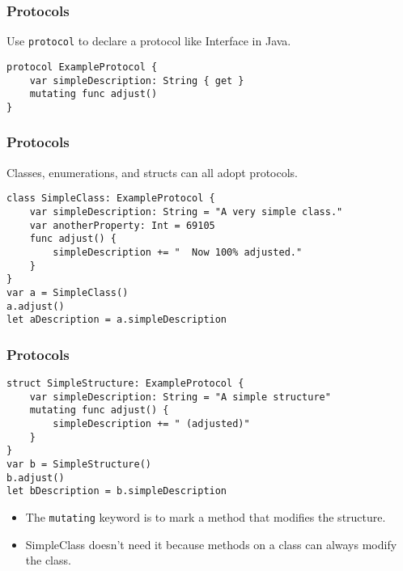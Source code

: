 \begin{frame}[fragile] \frametitle{Protocols}

Use \lstinline|protocol| to declare a protocol like Interface in Java.


\begin{lstlisting}
protocol ExampleProtocol {
    var simpleDescription: String { get }
    mutating func adjust()
}
\end{lstlisting}
\end{frame}

\begin{frame}[fragile] \frametitle{Protocols}

Classes, enumerations, and structs can all adopt protocols.

\begin{lstlisting}
class SimpleClass: ExampleProtocol {
    var simpleDescription: String = "A very simple class."
    var anotherProperty: Int = 69105
    func adjust() {
        simpleDescription += "  Now 100% adjusted."
    }
}
var a = SimpleClass()
a.adjust()
let aDescription = a.simpleDescription
\end{lstlisting}
\end{frame}

\begin{frame}[fragile] \frametitle{Protocols}

\begin{lstlisting}
struct SimpleStructure: ExampleProtocol {
    var simpleDescription: String = "A simple structure"
    mutating func adjust() {
        simpleDescription += " (adjusted)"
    }
}
var b = SimpleStructure()
b.adjust()
let bDescription = b.simpleDescription
\end{lstlisting}

\begin{itemize}
\item The \lstinline|mutating| keyword is to mark a method that modifies the structure. 
\item SimpleClass doesn’t need it because methods on a class can always modify the class.
\end{itemize}

\end{frame}


